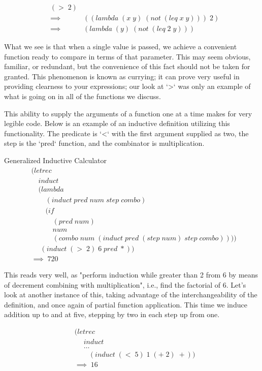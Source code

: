 \documentclass[11pt]{article}
\begin{document}
\begin{align*}
& (> \; 2)
\\& \implies \; &((lambda \; (x \; y) \; (not \; (leq \; x \; y))) \; 2)
\\& \implies \; &(lambda \; (y) \; (not \; (leq \; 2 \; y))) \; 
\end{align*}

What we see is that when a single value is passed, we achieve a convenient function ready to compare in terms of that parameter. This may seem obvious, familiar, or redundant, but the convenience of this fact should not be taken for granted. This phenomenon is known as currying; it can prove very useful in providing clearness to your expressions; our look at `>` was only an example of what is going on in all of the functions we discuss.

This ability to supply the arguments of a function one at a time makes for very legible code. Below is an example of an inductive definition utilizing this functionality. The predicate is `<` with the first argument supplied as two, the step is the `pred` function, and the combinator is multiplication.

Generalized Inductive Calculator
\begin{align*}
& (letrec \; 
\\& \quad induct \; 
\\& \quad (lambda \; 
\\& \qquad (induct \; pred \; num \; step \; combo) \; 
\\& \qquad (if \; 
\\& \qquad \quad (pred \; num) \; 
\\& \qquad \quad num \; 
\\& \qquad \quad (combo \; num \; (induct \; pred \; (step \; num) \; step \; combo)))) \; 
\\& \quad \; (induct \; (> \; 2) \; 6 \; pred \; *))
\\& \implies \; 720
\end{align*}

This reads very well, as "perform induction while greater than 2 from 6 by means of decrement combining with multiplication", i.e., find the factorial of 6. Let's look at another instance of this, taking advantage of the interchangeability of the definition, and once again of partial function application. This time we induce addition up to and at five, stepping by two in each step up from one.

\begin{align*}
& (letrec \; 
\\& \quad \; induct \; 
\\& \quad \; \dots
\\& \qquad (induct \; (< \; 5) \; 1 \; (+ \; 2) \; +))
\\& \implies \; 16
\end{align*}
\end{document}
